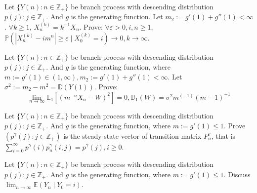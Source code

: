 \documentclass{ctexart}
\begin{document}
\begin{problem}\label{pro:3}
  Let \(\{Y(n): n \in \mathbb{Z}_+\}\) be branch process with descending distribution \(p(j): j \in \mathbb{Z}_+\).
  And \(g\) is the generating function. Let \(m_2:=g'(1) + g''(1) < \infty\).
  \(\forall k \geq 1\), \(X_n^{(k)}=k^{-1}X_n\).
  Prove: \(\forall \varepsilon >0, i,n \geq 1\), \(\mathbb{P}(|X_n^{(k)} -im^n| \geq \varepsilon \mid X_0^{(k)}=i) \to 0, k \to \infty\).
\end{problem}
\begin{problem}\label{pro:4}
  Let \(\{Y(n): n \in \mathbb{Z}_+\}\) be branch process with descending distribution \(p(j): j \in \mathbb{Z}_+\).
  And \(g\) is the generating function, where \(m :=g' (1) \in (1, \infty), m_2:=g'(1) + g''(1) < \infty\).
  Let \(\sigma^2:=m_2-m^2 = \mathbb{D}(Y(1))\).
  Prove: \[
    \lim_{n \to \infty}\mathbb{E}_1[(m^{-n}X_n -W)^2]= 0, \mathbb{D}_1(W)=\sigma^2 m^{(-1)}(m-1)^{-1}
  \]
\end{problem}
\begin{problem}\label{pro:5}
  Let \(\{Y(n): n \in \mathbb{Z}_+\}\) be branch process with descending distribution \(p(j): j \in \mathbb{Z}_+\).
  And \(g\) is the generating function, where \(m :=g' (1) \leq 1\).
  Prove \((p^\gamma(j): j \in \mathbb{Z}_+)\) is the steady-state vector of
  transition matrix \(P_n^\gamma\), that is \(\sum_{i =0}^{\infty} p^\gamma(i)p_n^\gamma(i,j)=p^{\gamma}(j), i \geq 0\).
\end{problem}
\begin{problem}\label{pro:6}
  Let \(\{Y(n): n \in \mathbb{Z}_+\}\) be branch process with descending distribution \(p(j): j \in \mathbb{Z}_+\).
  And \(g\) is the generating function, where \(m :=g' (1) \leq 1\).
  Discuss \(\lim_{n \to \infty}\mathbb{E}(Y_n \mid Y_0=i)\).
\end{problem}
\end{document}
